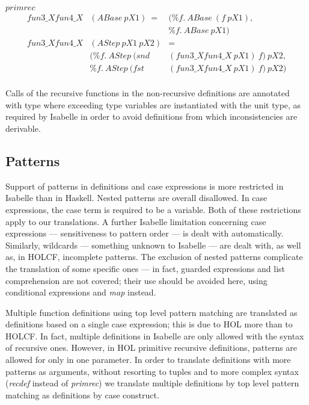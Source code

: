 \documentclass{llncs}
\begin{document}
\noindent $primrec$ 
$$\begin{array}{lll}
fun3\_Xfun4\_X & (ABase \ pX1) \ = & (\% f. \ ABase \ (f \ pX1), \\
                           &        &  \% f. \ ABase \ pX1) \\
fun3\_Xfun4\_X & (AStep \ pX1 \ pX2) & =  \\
  & (\% f. \ AStep \ (snd & (fun3\_Xfun4\_X \ pX1) \ f) \ pX2, \\
  &  \% f. \ AStep \ (fst & (fun3\_Xfun4\_X \ pX1) \ f) \ pX2) \\
\end{array}$$

\noindent Calls of the recursive functions in the non-recursive
definitions are annotated with type where exceeding type variables are
instantiated with the unit type, as required by Isabelle in order to
avoid definitions from which inconsistencies are derivable.


\subsection{Patterns}
\label{sec:Patterns}

Support of patterns in definitions and case expressions is more
restricted in Isabelle than in Haskell. Nested patterns are overall
disallowed. In case expressions, the case term is required to be a
variable. Both of these restrictions apply to our translations. A
further Isabelle limitation concerning case expressions ---
sensitiveness to pattern order --- is dealt with automatically.
Similarly, wildcards --- something unknown to Isabelle --- are dealt
with, as well as, in HOLCF, incomplete patterns.  The exclusion of
nested patterns complicate the translation of some specific ones ---
in fact, guarded expressions and list comprehension are not covered;
their use should be avoided here, using conditional expressions and
\emph{map} instead.


Multiple function definitions using top level pattern matching are
translated as definitions based on a single case expression; this is
due to HOL more than to HOLCF. In fact, multiple definitions in
Isabelle are only allowed with the syntax of recursive ones. However,
in HOL primitive recursive definitions, patterns are allowed for only
in one parameter. In order to translate definitions with more patterns
as arguments, without resorting to tuples and to more complex syntax
(\emph{recdef} instead of \emph{primrec}) we translate multiple
definitions by top level pattern matching
as definitions by case construct.\\
\end{document}
